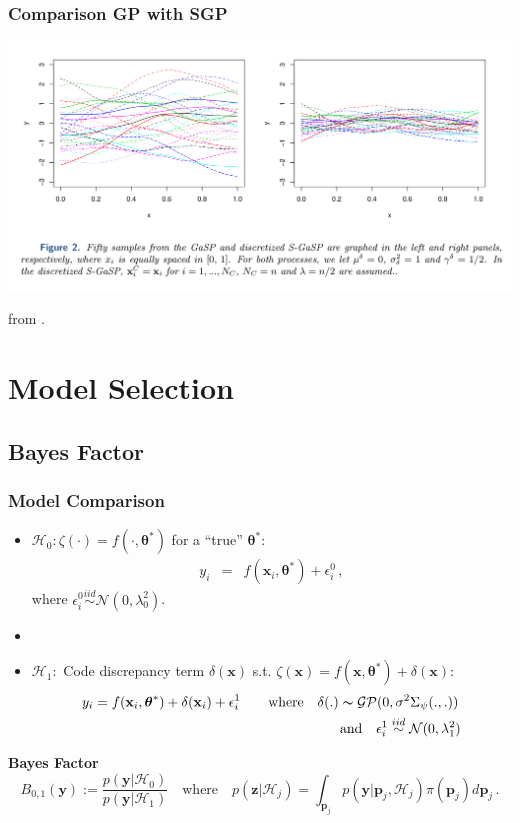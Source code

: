 \documentclass[nopagenumber,9pt]{beamer}
\newcommand{\bs}{\boldsymbol}
\newcommand{\btheta}{\boldsymbol{\theta}}
\newcommand{\bx}{\mathbf{x}}
\begin{document}
\begin{frame}
 \frametitle{Comparison GP with SGP}
 \centering
 
 \includegraphics[scale=.2]{SGASP.png}
 
 from \cite{gu2017}.
\end{frame}



\section{Model Selection}

\subsection{Bayes Factor}
\begin{frame}
 \frametitle{Model Comparison}

 
 \begin{itemize}
  \item  $\mathcal{H}_0: \zeta(\cdot)= f(\cdot,{\btheta}^*)$ for a ``true'' $\btheta^*$:
\begin{eqnarray*}\label{eq:H0}
y_i &=& f(\bx_i,{\btheta}^*) + \epsilon^0_i\,,
\end{eqnarray*}
where $\epsilon_i^0 \overset{iid}{\sim} \mathcal{N}(0, \lambda_0^2)$.

\item[]


\item $\mathcal{H}_1:$ {\color{red} Code discrepancy} term $\delta(\bx)$ s.t.
$\zeta(\bx) = f(\bx,{\btheta}^*)+\delta(\bx) $:
 \begin{eqnarray*}\label{eq:H1}
 y_i = f(\bx_i,{\btheta}^*) + \delta(\bx_i) + \epsilon^1_i&\quad& \text{where}\quad \delta(.)\thicksim\mathcal{GP}(0,\sigma^2\Sigma_{{\psi}}(.,.))\nonumber\,\\
 &&\text{and} \quad \epsilon_i^1 \overset{iid}{\sim} \mathcal{N}(0, \lambda_1^2)
 \end{eqnarray*}

 \end{itemize}

 \bigskip
 \textbf{Bayes Factor}
  $$B_{0,1}(\bs y):=\frac
{p(\bs y|\mathcal H_0)}
{p(\bs y|\mathcal H_1)}\quad \text{where}\quad p(\bs z|\mathcal H_j) = \int_{\bs p_j} p(\bs y|\bs p_j, \mathcal H_j)\pi(\bs p_j)d \bs p_j\,.$$
  
 
\end{frame}
\end{document}
